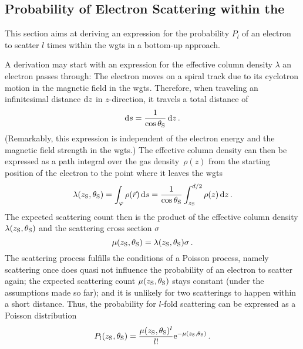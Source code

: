 \subsection{Probability of Electron Scattering within the }
\label{sec:intSpecModelResponseScattering}
This section aims at deriving an expression for the probability $P_l$ of an electron to scatter $l$ times within the \gls{wgts} in a bottom-up approach.

A derivation may start with an expression for the effective column density $\lambda$ an electron passes through: The electron moves on a spiral track due to its cyclotron motion in the magnetic field in the \gls{wgts}. Therefore, when traveling an infinitesimal distance $\mathop{}\!\mathrm{d} z$ in $z$-direction, it travels a total distance of
\begin{equation}
\label{eq:intSpecModelInfinitesimalElecPath}
\mathop{}\!\mathrm{d} s = \frac{1}{\cos\theta_\mathrm{S}} \mathop{}\!\mathrm{d} z 
\text{\,.}
\end{equation}
(Remarkably, this expression is independent of the electron energy and the magnetic field strength in the \gls{wgts}.)
The effective column density can then be expressed as a path integral over the gas density~$\rho(z)$ from the starting position of the electron to the point where it leaves the \gls{wgts}
\begin{equation}
\label{eq:intSpecModelEffColumnDensity}
\lambda(z_\mathrm{S},\theta_\mathrm{S}) = 
\int_{\varphi} \rho(\Vec{r})\mathop{}\!\mathrm{d} s =
\frac{1}{\cos\theta_\mathrm{S}}
\int_{z_\mathrm{S}}^{d/2} \rho(z)\mathop{}\!\mathrm{d} z
\text{\,.}
\end{equation}
The expected scattering count then is the product of the effective column density $\lambda(z_\mathrm{S},\theta_\mathrm{S})$ and the scattering cross section $\sigma$~\cite{Groh2015}
\begin{equation}
\label{eq:intSpecModelExpectedScatteringCount}
\mu(z_\mathrm{S}, \theta_\mathrm{S}) = \lambda(z_\mathrm{S},\theta_\mathrm{S}) \sigma \text{\,.}
\end{equation}
The scattering process fulfills the conditions of a Poisson process, namely scattering once does quasi not influence the probability of an electron to scatter again; the expected scattering count $\mu(z_\mathrm{S}, \theta_\mathrm{S})$ stays constant (under the assumptions made so far); and it is unlikely for two scatterings to happen within a short distance. Thus, the probability for $l$-fold scattering can be expressed as a Poisson distribution~\cite{Groh2015}
\begin{equation}
\label{eq:intSpecModelNonAveragedScatProbs}
P_l(z_\mathrm{S}, \theta_\mathrm{S}) = 
\frac{
	\mu(z_\mathrm{S}, \theta_\mathrm{S})^l
}{l!}
\mathrm{e}^{-\mu(z_\mathrm{S}, \theta_\mathrm{S})} \text{\,.}
\end{equation}
